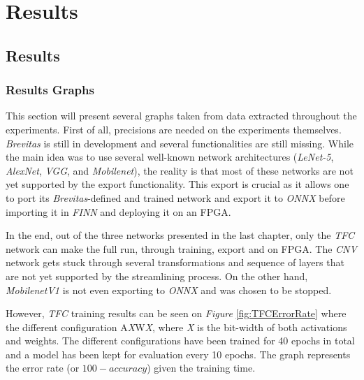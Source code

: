 \chapter{Results} %

\label{Chapter7} %



\section{Results}


\subsection{Results Graphs}

This section will present several graphs taken from data extracted throughout the experiments. First of all, precisions are needed on the experiments themselves. \emph{Brevitas} is still in development and several functionalities are still missing. While the main idea was to use several well-known network architectures (\emph{LeNet-5}, \emph{AlexNet}, \emph{VGG}, and \emph{Mobilenet}), the reality is that most of these networks are not yet supported by the export functionality. This export is crucial as it allows one to port its \emph{Brevitas}-defined and trained network and export it to \emph{ONNX} before importing it in \emph{FINN} and deploying it on an FPGA.

In the end, out of the three networks presented in the last chapter, only the \emph{TFC} network can make the full run, through training, export and on FPGA. The \emph{CNV} network gets stuck through several transformations and sequence of layers that are not yet supported by the streamlining process. On the other hand, \emph{MobilenetV1} is not even exporting to \emph{ONNX} and was chosen to be stopped.

However, \emph{TFC} training results can be seen on \emph{Figure} \ref{fig:TFCErrorRate} where the different configuration A\emph{X}W\emph{X}, where \emph{X} is the bit-width of both activations and weights. The different configurations have been trained for 40 epochs in total and a model has been kept for evaluation every 10 epochs. The graph represents the error rate (or $100 - accuracy$) given the training time.

